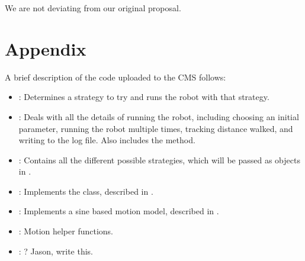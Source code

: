 We are not deviating from our original proposal.



\section{Appendix}

A brief description of the code uploaded to the CMS follows:

\begin{itemize}
\item {}: Determines a strategy to try and runs the robot
  with that strategy.
\item {}: Deals with all the details of running the robot,
  including choosing an initial parameter, running the robot multiple times, 
  tracking distance walked, and writing to the log file. Also includes the
   method.
\item {}: Contains all the different possible strategies, which
  will be passed as objects in . 
\item {}: Implements the  class, described in
  .
\item {}: Implements a sine based motion model,
  described in .
\item {}: Motion helper functions.
\item {}: ? Jason, write this.
\end{itemize}
